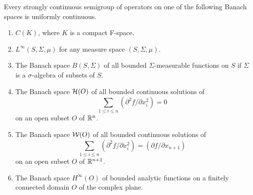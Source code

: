 \begin{theorem}\label{thm:a2-3.6}
Every strongly continuous semigroup of operators on one of the following Banach spaces is uniformly continuous.
\begin{enumerate}[\upshape (i)]
\item \label{thm:a2-3.6-1}
$C(K)$, where $K$ is a compact F-space.
\item \label{thm:a2-3.6-2}
$L^{\infty}(S,\Sigma,\mu)$ for any measure space $(S,\Sigma,\mu)$.
\item \label{thm:a2-3.6-3}
The Banach space $B(S,\Sigma)$ of all bounded $\Sigma$-measurable functions on $S$ if  $\Sigma$ is a  $\sigma$-algebra of subsets of\/ $S$.
\item \label{thm:a2-3.6-4}
The Banach space $\mathcal{H}(O)$ of all bounded continuous solutions of
\[
\sum_{1 \leq i \leq n} (\partial^2f/\partial x_i^2) = 0
\]
on an open subset $O$ of\/ $\mathbb{R}^n$.
\item \label{thm:a2-3.6-5}
The Banach space $\mathcal{W}(O)$ of all bounded continuous solutions of
\[
\sum_{1 \leq i \leq n} (\partial^2f/\partial x_i^2) = (\partial f/\partial x_{n+1})
\]
on an open subset $O$ of  $\mathbb{R}^{n+1}$.
\item \label{thm:a2-3.6-6}
The Banach space $H^{\infty}(O)$ of bounded analytic functions on a finitely connected domain $O$ of the complex plane.
\end{enumerate}
\end{theorem}
